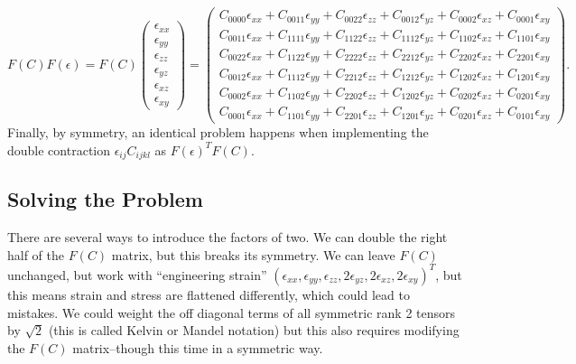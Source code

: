 \documentclass[10pt]{article}
\providecommand{\e}{\epsilon}
\begin{document}
$$
F(C) F(\epsilon) =
F(C)
\begin{pmatrix}
\epsilon_{xx} \\
\epsilon_{yy} \\
\epsilon_{zz} \\
\epsilon_{yz} \\
\epsilon_{xz} \\
\epsilon_{xy}
\end{pmatrix} =
\begin{pmatrix}
C_{0000} \epsilon_{xx} + C_{0011} \epsilon_{yy} + C_{0022} \epsilon_{zz} + C_{0012} \epsilon_{yz} + C_{0002} \epsilon_{xz} + C_{0001} \epsilon_{xy} \\
C_{0011} \epsilon_{xx} + C_{1111} \epsilon_{yy} + C_{1122} \epsilon_{zz} + C_{1112} \epsilon_{yz} + C_{1102} \epsilon_{xz} + C_{1101} \epsilon_{xy} \\
C_{0022} \epsilon_{xx} + C_{1122} \epsilon_{yy} + C_{2222} \epsilon_{zz} + C_{2212} \epsilon_{yz} + C_{2202} \epsilon_{xz} + C_{2201} \epsilon_{xy} \\
C_{0012} \epsilon_{xx} + C_{1112} \epsilon_{yy} + C_{2212} \epsilon_{zz} + C_{1212} \epsilon_{yz} + C_{1202} \epsilon_{xz} + C_{1201} \epsilon_{xy} \\
C_{0002} \epsilon_{xx} + C_{1102} \epsilon_{yy} + C_{2202} \epsilon_{zz} + C_{1202} \epsilon_{yz} + C_{0202} \epsilon_{xz} + C_{0201} \epsilon_{xy} \\
C_{0001} \epsilon_{xx} + C_{1101} \epsilon_{yy} + C_{2201} \epsilon_{zz} + C_{1201} \epsilon_{yz} + C_{0201} \epsilon_{xz} + C_{0101} \epsilon_{xy}
\end{pmatrix}.
$$
Finally, by symmetry, an identical problem happens when implementing the double
contraction $\e_{ij} C_{ijkl}$ as $F(\e)^T F(C)$.

\subsection{Solving the Problem}
There are several ways to introduce the factors of two. We can double the right
half of the $F(C)$ matrix, but this breaks its symmetry. We can leave $F(C)$
unchanged, but work with ``engineering strain'' $(\e_{xx}, \e_{yy}, \e_{zz}, 2
\e_{yz}, 2 \e_{xz}, 2 \e_{xy})^T$, but this means strain and stress are
flattened differently, which could lead to mistakes. We could weight the off
diagonal terms of all symmetric rank 2 tensors by $\sqrt{2}$ (this is called
Kelvin or Mandel notation) but this also requires modifying the $F(C)$
matrix--though this time in a symmetric way.
\end{document}
